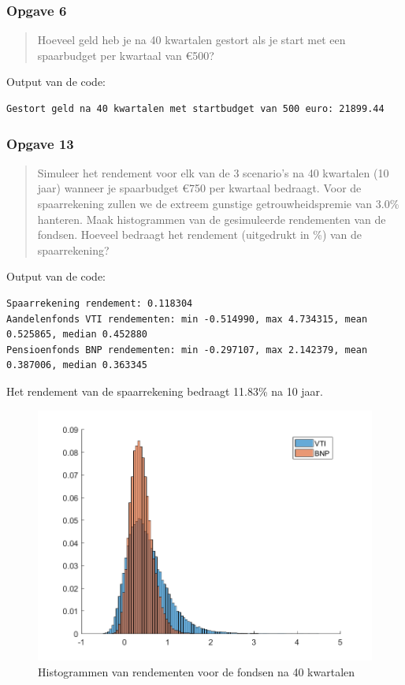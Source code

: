 \documentclass[11pt, a4paper, titlepage, openright]{article}
\begin{document}
	\subsubsection{Opgave 6}
		\begin{quote}
			Hoeveel geld heb je na 40 kwartalen gestort als je start met een spaarbudget per kwartaal van \euro 500?
		\end{quote}
		
		\noindent Output van de code:
\begin{lstlisting}
Gestort geld na 40 kwartalen met startbudget van 500 euro: 21899.44\end{lstlisting}
	
	\newpage
	\subsubsection{Opgave 13}
		\begin{quote}
			 Simuleer het rendement voor elk van de 3 scenario's na 40 kwartalen (10 jaar) wanneer je spaarbudget \euro750
			 per kwartaal bedraagt. Voor de spaarrekening zullen we de extreem gunstige getrouwheidspremie van 3.0\% 
			 hanteren. Maak histogrammen van de gesimuleerde rendementen van de fondsen. 
			 Hoeveel bedraagt het rendement (uitgedrukt in \%) van de spaarrekening?
		\end{quote}
		
		\noindent Output van de code:
\begin{lstlisting}
Spaarrekening rendement: 0.118304
Aandelenfonds VTI rendementen: min -0.514990, max 4.734315, mean 0.525865, median 0.452880
Pensioenfonds BNP rendementen: min -0.297107, max 2.142379, mean 0.387006, median 0.363345\end{lstlisting}
		Het rendement van de spaarrekening bedraagt 11.83\% na 10 jaar.
		
		\begin{figure}[H]
		\centering
		\includegraphics[width=1\linewidth]{../ex13}
		\caption{Histogrammen van rendementen voor de fondsen na 40 kwartalen}
		\label{fig:ex13}
		\end{figure}
		
\end{document}
